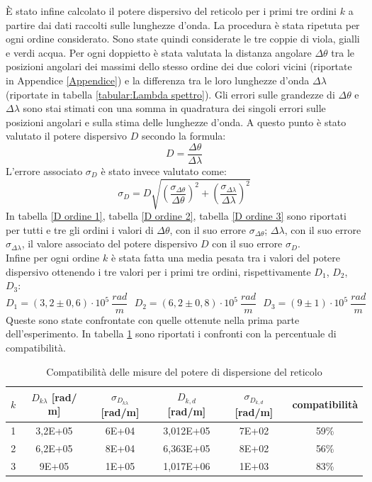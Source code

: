 \documentclass{article}
\begin{document}
        È stato infine calcolato il potere dispersivo del reticolo per i primi tre ordini $k$ a partire dai dati raccolti sulle lunghezze d'onda.
        La procedura è stata ripetuta per ogni ordine considerato. Sono state quindi considerate le tre coppie di viola, gialli e verdi acqua. 
        Per ogni doppietto è stata valutata la distanza angolare $\Delta \theta$ tra le posizioni angolari dei massimi dello stesso ordine dei due colori vicini 
        (riportate in Appendice \ref{Appendice}) e la differenza tra le loro lunghezze d'onda $\Delta \lambda$ (riportate in tabella \ref{tabular:Lambda spettro}). 
        Gli errori sulle grandezze di $\Delta \theta$ e $\Delta \lambda$ sono stai stimati con una somma in quadratura dei singoli errori sulle posizioni angolari e
        sulla stima delle lunghezze d'onda. A questo punto è stato valutato il potere dispersivo $D$ secondo la formula: \[D = \frac{\Delta \theta}{\Delta \lambda}\]
        L'errore associato $\sigma_D$ è stato invece valutato come:
        \[\sigma_D = D \sqrt{(\frac{\sigma_{\Delta \theta}}{\Delta \theta})^2 + (\frac{\sigma_{\Delta \lambda}}{\Delta \lambda})^2}\]
        In tabella \ref{D ordine 1}, tabella \ref{D ordine 2}, tabella \ref{D ordine 3} sono riportati per tutti e tre gli ordini i valori di $\Delta \theta$,
        con il suo errore $\sigma_{\Delta \theta}$; $\Delta \lambda$, con il suo errore $\sigma_{\Delta \lambda}$, il valore associato del potere dispersivo $D$ 
        con il suo errore $\sigma_D$. \\

        Infine per ogni ordine $k$ è stata fatta una media pesata tra i valori del potere dispersivo ottenendo i tre valori per i primi tre ordini, 
        rispettivamente $D_1$, $D_2$, $D_3$:
        \[D_1 = (3,2 \pm 0,6) \cdot 10^{5} \ \frac{rad}{m}\ \ \ 
        D_2 = (6,2 \pm 0,8)\cdot 10^{5}\  \frac{rad}{m}\ \ \ 
        D_3 = (9 \pm 1)\cdot 10^{5}\  \frac{rad}{m}\]
        Queste sono state confrontate con quelle ottenute nella prima parte dell'esperimento. 
        In tabella \ref{compatibilità D} sono riportati i confronti con la percentuale di compatibilità. 
        
        \begin{table}[H]
            \centering
            \begin{tabular}{c c c c c c }
                \toprule 
                $k$ & $D_{k\lambda}$ [rad/ m] & $\sigma_{D_{k\lambda}}$ [rad/m]  & $D_{k,d}$ [rad/m] & $\sigma_{D_{k,d}}$ [rad/m] & compatibilità \\
                \midrule
                1	&	3,2E+05	&	6E+04	&	3,012E+05	&	7E+02	&	59\% \\
                2	&	6,2E+05	&	8E+04	&	6,363E+05	&	8E+02	&	56\% \\
                3	&	9E+05	&	1E+05	&	1,017E+06	&	1E+03	&	83\% \\
                \bottomrule
            \end{tabular}
            \caption{Compatibilità delle misure del potere di dispersione del reticolo}
            \label{compatibilità D}
        \end{table}
        
\end{document}
